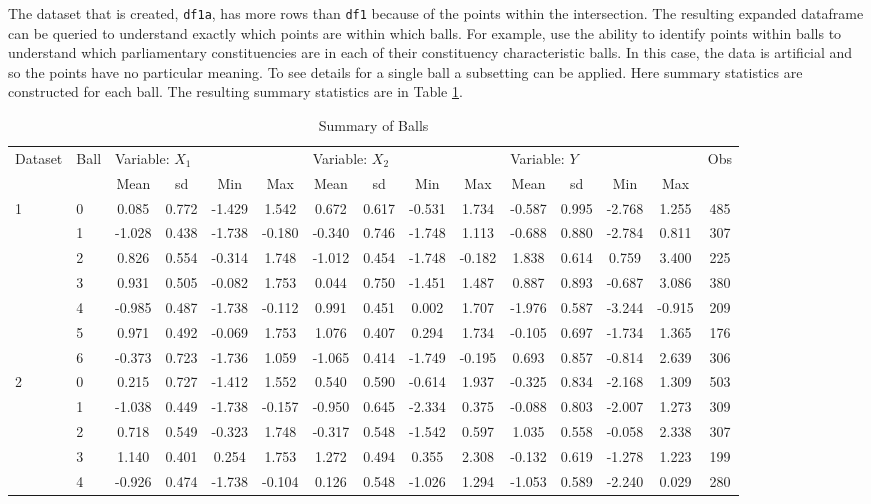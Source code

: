 \documentclass{article}
\begin{document}
The dataset that is created, \texttt{df1a}, has more rows than \texttt{df1} because of the points within the intersection. The resulting expanded dataframe can be queried to understand exactly which points are within which balls. For example, \cite{rudkin2023economic} use the ability to identify points within balls to understand which parliamentary constituencies are in each of their constituency characteristic balls. In this case, the data is artificial and so the points have no particular meaning. To see details for a single ball a subsetting can be applied. Here summary statistics are constructed for each ball. The resulting summary statistics are in Table \ref{tab:summary}.


\begin{table}
	\begin{center}
		\caption{Summary of Balls}
		\label{tab:summary}
		\begin{tabular}{l l c c c c c c c c c c c c c }
			\hline
			Dataset & Ball & \multicolumn{4}{l}{Variable: $X_1$} & \multicolumn{4}{l}{Variable: $X_2$} & \multicolumn{4}{l}{Variable: $Y$} & Obs \\
			&& Mean & sd & Min & Max & Mean & sd & Min & Max & Mean & sd & Min & Max & \\
			\hline
											
			1 &0&	0.085&	0.772&	-1.429&	1.542&	0.672&	0.617&	-0.531&	1.734&	-0.587&	0.995&	-2.768&	1.255 & 485\\
			&1&	-1.028&	0.438&	-1.738&	-0.180&	-0.340&	0.746&	-1.748&	1.113&	-0.688&	0.880&	-2.784&	0.811 & 307\\
			&2&	0.826&	0.554&	-0.314&	1.748&	-1.012&	0.454&	-1.748&	-0.182&	1.838&	0.614&	0.759&	3.400 & 225\\
			&3&	0.931&	0.505&	-0.082&	1.753&	0.044&	0.750&	-1.451&	1.487&	0.887&	0.893&	-0.687&	3.086 & 380\\
			&4&	-0.985&	0.487&	-1.738&	-0.112&	0.991&	0.451&	0.002&	1.707&	-1.976&	0.587&	-3.244&	-0.915 & 209\\
			&5&	0.971&	0.492&	-0.069&	1.753&	1.076&	0.407&	0.294&	1.734&	-0.105&	0.697&	-1.734&	1.365 & 176 \\
			&6&	-0.373&	0.723&	-1.736&	1.059&	-1.065&	0.414&	-1.749&	-0.195&	0.693&	0.857&	-0.814	&2.639& 306\\
			2& 0 &	0.215 &	0.727&	-1.412&	1.552&	0.540&	0.590&	-0.614&	1.937&	-0.325&	0.834&	-2.168&	1.309 & 503\\
			&1&	-1.038&	0.449&	-1.738&	-0.157&	-0.950&	0.645&	-2.334&	0.375&	-0.088&	0.803&	-2.007&	1.273 & 309\\
			&2&	0.718&	0.549&	-0.323&	1.748&	-0.317&	0.548&	-1.542&	0.597&	1.035&	0.558&	-0.058&	2.338 & 307\\
			&3&	1.140&	0.401&	0.254&	1.753&	1.272&	0.494&	0.355&	2.308&	-0.132&	0.619&	-1.278&	1.223 & 199\\
			&4&	-0.926&	0.474&	-1.738&	-0.104&	0.126&	0.548&	-1.026&	1.294&	-1.053&	0.589&	-2.240&	0.029 & 280\\
			

\end{tabular}
\end{center}
\end{table}
\end{document}
